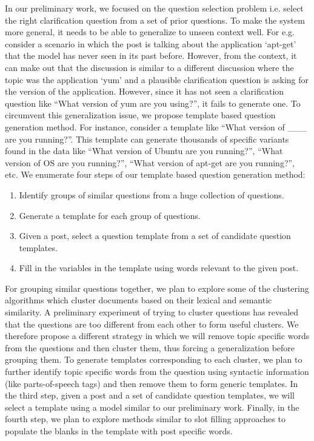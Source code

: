 \documentclass[11pt]{report}
\begin{document}
In our preliminary work, we focused on the question selection problem i.e. select the right clarification question from a set of prior questions. To make the system more general, it needs to be able to generalize to unseen context well. For e.g. consider a scenario in which the post is talking about the application `apt-get' that the model has never seen in its past before. However, from the context, it can make out that the discussion is similar to a different discussion where the topic was the application `yum' and a plausible clarification question is asking for the version of the application. However, since it has not seen a clarification question like ``What version of yum are you using?'', it fails to generate one. To circumvent this generalization issue, we propose template based question generation method. For instance, consider a template like ``What version of \_\_\_  are you running?''. This template can generate thousands of specific variants found in the data like ``What version of Ubuntu are you running?'', ``What version of OS are you running?'', ``What version of apt-get are you running?'', etc. We enumerate four steps of our template based question generation method:
\begin{enumerate}
\item Identify groups of similar questions from a huge collection of questions.
\item Generate a template for each group of questions.
\item Given a post, select a question template from a set of candidate question templates.
\item Fill in the variables in the template using words relevant to the given post.
\end{enumerate}

For grouping similar questions together, we plan to explore some of the clustering algorithms which cluster documents based on their lexical and semantic similarity. A preliminary experiment of trying to cluster questions has revealed that the questions are too different from each other to form useful clusters. We therefore propose a different strategy in which we will remove topic specific words from the questions and then cluster them, thus forcing a generalization before grouping them. To generate templates corresponding to each cluster, we plan to further identify topic specific words from the question using syntactic information (like parts-of-speech tags) and then remove them to form generic templates. In the third step, given a post and a set of candidate question templates, we will select a template using a model similar to our preliminary work. Finally, in the fourth step, we plan to explore methods similar to slot filling approaches \cite{} to populate the blanks in the template with post specific words.
\end{document}
